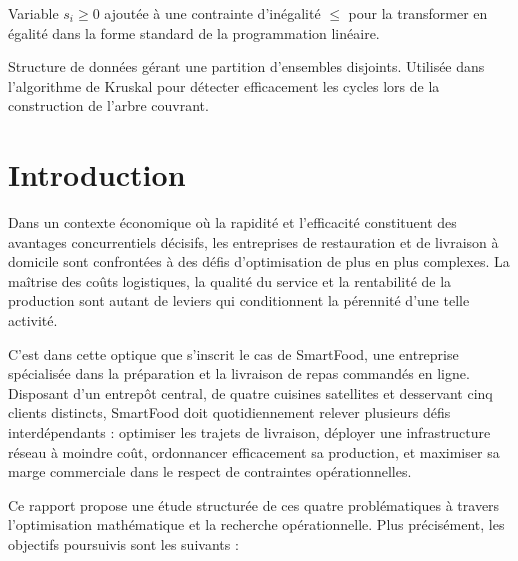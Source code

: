\documentclass[12pt,a4paper]{article}
\begin{document}
\begin{description}[style=nextline, leftmargin=0.5cm]
  \item[\textbf{Variable d'écart}]
  Variable $s_i \geq 0$ ajoutée à une contrainte d'inégalité $\leq$ pour la transformer
  en égalité dans la forme standard de la programmation linéaire.

  \item[\textbf{Union-Find}]
  Structure de données gérant une partition d'ensembles disjoints. Utilisée dans
  l'algorithme de Kruskal pour détecter efficacement les cycles lors de la construction
  de l'arbre couvrant.

\end{description}

\newpage

\setcounter{page}{1}


\section*{Introduction}

Dans un contexte économique où la rapidité et l'efficacité constituent des avantages
concurrentiels décisifs, les entreprises de restauration et de livraison à domicile sont
confrontées à des défis d'optimisation de plus en plus complexes. La maîtrise des coûts
logistiques, la qualité du service et la rentabilité de la production sont autant de leviers
qui conditionnent la pérennité d'une telle activité.

C'est dans cette optique que s'inscrit le cas de SmartFood, une entreprise spécialisée
dans la préparation et la livraison de repas commandés en ligne. Disposant d'un entrepôt
central, de quatre cuisines satellites et desservant cinq clients distincts, SmartFood doit
quotidiennement relever plusieurs défis interdépendants : optimiser les trajets de
livraison, déployer une infrastructure réseau à moindre coût, ordonnancer efficacement
sa production, et maximiser sa marge commerciale dans le respect de contraintes
opérationnelles.

Ce rapport propose une étude structurée de ces quatre problématiques à travers
l'optimisation mathématique et la recherche opérationnelle. Plus précisément, les
objectifs poursuivis sont les suivants :
\end{document}

